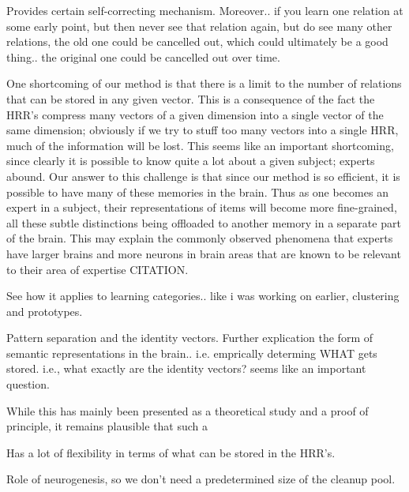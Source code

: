 \documentclass[10pt,letterpaper]{article}
\begin{document}
Provides certain self-correcting mechanism.
Moreover.. if you learn one relation at some early point, but then never see that relation again, but do see many other relations, the old one could be cancelled out, which could ultimately be a good thing.. the original one could be cancelled out over time.

One shortcoming of our method is that there is a limit to the number of relations that can be stored in any given vector. This is a consequence of the fact the HRR's compress many vectors of a given dimension into a single vector of the same dimension; obviously if we try to stuff too many vectors into a single HRR, much of the information will be lost. This seems like an important shortcoming, since clearly it is possible to know quite a lot about a given subject; experts abound. Our answer to this challenge is that since our method is so efficient, it is possible to have many of these memories in the brain. Thus as one becomes an expert in a subject, their representations of items will become more fine-grained, all these subtle distinctions being offloaded to another memory in a separate part of the brain. This may explain the commonly observed phenomena that experts have larger brains and more neurons in brain areas that are known to be relevant to their area of expertise CITATION.

See how it applies to learning categories.. like i was working on earlier, clustering and prototypes.

Pattern separation and the identity vectors.
Further explication the form of semantic representations in the brain.. i.e. emprically determing WHAT gets stored. i.e., what exactly are the identity vectors? seems like an important question.

While this has mainly been presented as a theoretical study and a proof of principle, it remains plausible that such a 

Has a lot of flexibility in terms of what can be stored in the HRR's.

Role of neurogenesis, so we don't need a predetermined size of the cleanup pool. 

\end{document}
